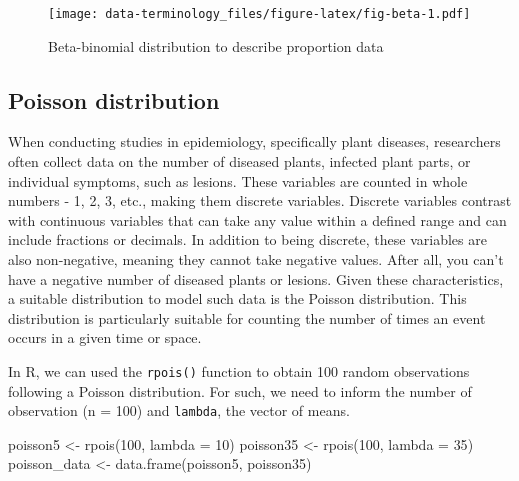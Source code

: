 \documentclass[
  letterpaper,
]{book}
\newenvironment{Shaded}{\begin{snugshade}}{\end{snugshade}}
\newcommand{\AttributeTok}[1]{\textcolor[rgb]{0.40,0.45,0.13}{#1}}
\newcommand{\DecValTok}[1]{\textcolor[rgb]{0.68,0.00,0.00}{#1}}
\newcommand{\FunctionTok}[1]{\textcolor[rgb]{0.28,0.35,0.67}{#1}}
\newcommand{\NormalTok}[1]{\textcolor[rgb]{0.00,0.23,0.31}{#1}}
\newcommand{\OtherTok}[1]{\textcolor[rgb]{0.00,0.23,0.31}{#1}}
\begin{document}
\begin{figure}

{\centering \texttt{[image: data-terminology\_files/figure-latex/fig-beta-1.pdf]}

}

\caption{\label{fig-beta}Beta-binomial distribution to describe
proportion data}

\end{figure}

\hypertarget{poisson-distribution}{%
\subsection{Poisson distribution}\label{poisson-distribution}}

When conducting studies in epidemiology, specifically plant diseases,
researchers often collect data on the number of diseased plants,
infected plant parts, or individual symptoms, such as lesions. These
variables are counted in whole numbers - 1, 2, 3, etc., making them
discrete variables. Discrete variables contrast with continuous
variables that can take any value within a defined range and can include
fractions or decimals. In addition to being discrete, these variables
are also non-negative, meaning they cannot take negative values. After
all, you can't have a negative number of diseased plants or lesions.
Given these characteristics, a suitable distribution to model such data
is the Poisson distribution. This distribution is particularly suitable
for counting the number of times an event occurs in a given time or
space.

In R, we can used the \texttt{rpois()} function to obtain 100 random
observations following a Poisson distribution. For such, we need to
inform the number of observation (n = 100) and \texttt{lambda}, the
vector of means.

\begin{Shaded}
\begin{Highlighting}[]
\NormalTok{poisson5 }\OtherTok{\textless{}{-}} \FunctionTok{rpois}\NormalTok{(}\DecValTok{100}\NormalTok{, }\AttributeTok{lambda =} \DecValTok{10}\NormalTok{)}
\NormalTok{poisson35 }\OtherTok{\textless{}{-}} \FunctionTok{rpois}\NormalTok{(}\DecValTok{100}\NormalTok{, }\AttributeTok{lambda =} \DecValTok{35}\NormalTok{)}
\NormalTok{poisson\_data }\OtherTok{\textless{}{-}} \FunctionTok{data.frame}\NormalTok{(poisson5, poisson35)}
\end{Highlighting}
\end{Shaded}
\end{document}
